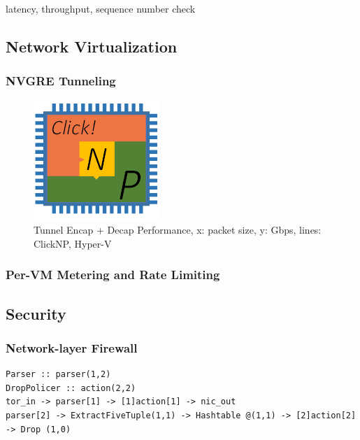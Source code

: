 {latency, throughput, sequence number check

\subsection{Network Virtualization}

\subsubsection{NVGRE Tunneling}

\begin{figure}[h!]
	\centering
	\includegraphics[width=0.6\columnwidth]{image/logo}
	\vspace{-0.15in}
	\caption{Tunnel Encap + Decap Performance, x: packet size, y: Gbps, lines: ClickNP, Hyper-V}
	\vspace{-0.15in}
	\label{clicknp:fig:NVGREPerformance}
\end{figure}

\subsubsection{Per-VM Metering and Rate Limiting}

\subsection{Security}

\subsubsection{Network-layer Firewall}

\begin{lstlisting}
Parser :: parser(1,2)
DropPolicer :: action(2,2)
tor_in -> parser[1] -> [1]action[1] -> nic_out
parser[2] -> ExtractFiveTuple(1,1) -> Hashtable @(1,1) -> [2]action[2] -> Drop (1,0)
\end{lstlisting}

}
